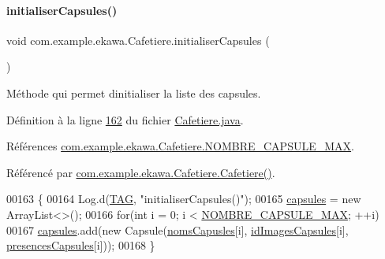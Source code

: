 \paragraph{\texorpdfstring{initialiser\+Capsules()}{initialiserCapsules()}}
{\footnotesize\ttfamily void com.\+example.\+ekawa.\+Cafetiere.\+initialiser\+Capsules (\begin{DoxyParamCaption}{ }\end{DoxyParamCaption})\hspace{0.3cm}{\ttfamily [private]}}



Méthode qui permet d\textquotesingle{}initialiser la liste des capsules. 



Définition à la ligne \hyperlink{_cafetiere_8java_source_l00162}{162} du fichier \hyperlink{_cafetiere_8java_source}{Cafetiere.\+java}.



Références \hyperlink{_cafetiere_8java_source_l00029}{com.\+example.\+ekawa.\+Cafetiere.\+N\+O\+M\+B\+R\+E\+\_\+\+C\+A\+P\+S\+U\+L\+E\+\_\+\+M\+AX}.



Référencé par \hyperlink{_cafetiere_8java_source_l00108}{com.\+example.\+ekawa.\+Cafetiere.\+Cafetiere()}.


\begin{DoxyCode}
00163     \{
00164         Log.d(\hyperlink{classcom_1_1example_1_1ekawa_1_1_cafetiere_aa0c1fd99a2508b06c462aea17034aa91}{TAG}, \textcolor{stringliteral}{"initialiserCapsules()"});
00165         \hyperlink{classcom_1_1example_1_1ekawa_1_1_cafetiere_ae9590789503a6ae2094c86cf93299821}{capsules} = \textcolor{keyword}{new} ArrayList<>();
00166         \textcolor{keywordflow}{for}(\textcolor{keywordtype}{int} i = 0; i < \hyperlink{classcom_1_1example_1_1ekawa_1_1_cafetiere_a183d96e89c056c4ac9c565bf8f24851e}{NOMBRE\_CAPSULE\_MAX}; ++i)
00167             \hyperlink{classcom_1_1example_1_1ekawa_1_1_cafetiere_ae9590789503a6ae2094c86cf93299821}{capsules}.add(\textcolor{keyword}{new} Capsule(\hyperlink{classcom_1_1example_1_1ekawa_1_1_cafetiere_a127a27c8f3b4c6c5dc4bfb639f654b3d}{nomsCapusles}[i], 
      \hyperlink{classcom_1_1example_1_1ekawa_1_1_cafetiere_a7558b3f423bd53d4198a7c143bd2d657}{idImagesCapsules}[i], \hyperlink{classcom_1_1example_1_1ekawa_1_1_cafetiere_aebaaf300362a258e047ae31b7e56e622}{presencesCapsules}[i]));
00168     \}
\end{DoxyCode}
\mbox{\label{classcom_1_1example_1_1ekawa_1_1_cafetiere_ad7c3e155b2ddf4dae05da8cd9c38518a}} 
